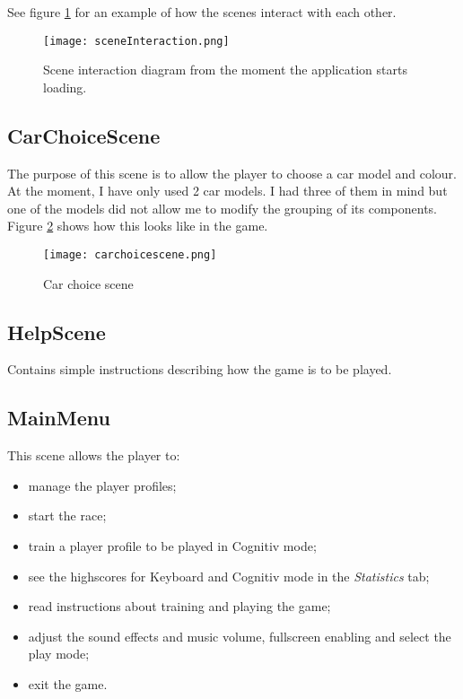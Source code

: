 See figure \ref{fig:sceneInteraction} for an example of how the scenes interact with each other.

\begin{figure}
  \centering
  \texttt{[image: sceneInteraction.png]}
  \caption{Scene interaction diagram from the moment the application starts loading.}
    \label{fig:sceneInteraction}           
\end{figure}

\subsection{CarChoiceScene}
The purpose of this scene is to allow the player to choose a car model and colour. At the moment, I have only used 2 car models. I had three of them in mind but one of the models did not allow me to modify the grouping of its components. Figure \ref{fig:carchoicescene} shows how this looks like in the game.

\begin{figure}
  \centering
  \texttt{[image: carchoicescene.png]}
  \caption{Car choice scene}
    \label{fig:carchoicescene}           
\end{figure}

\subsection{HelpScene}
Contains simple instructions describing how the game is to be played. 

\subsection{MainMenu}
This scene allows the player to:
\begin{itemize}
	\item manage the player profiles;
	\item start the race;
	\item train a player profile to be played in Cognitiv mode;
	\item see the highscores for Keyboard and Cognitiv mode in the \textit{Statistics} tab;
	\item read instructions about training and playing the game;
	\item adjust the sound effects and music volume, fullscreen enabling and select the play mode;
	\item exit the game.
\end{itemize}

